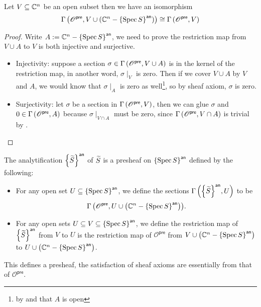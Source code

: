 \begin{corollary}
  Let $V\subseteq\mathbb{C}^{n}$ be an open subset then we have an isomorphism
  \[
{\Gamma\left(\mathscr{O}^{\mathsf{pre}},V \cup (\mathbb{C}^{n} - {\left\{{\operatorname{Spec} S}\right\}}^{\mathsf{an}})\right)} \cong {\Gamma\left(\mathscr{O}^{\mathsf{pre}},V\right)}
  \]
\end{corollary}
\begin{proof}
  Write $A := \mathbb{C}^{n}-{\left\{{\operatorname{Spec} S}\right\}}^{\mathsf{an}}$, we need to prove the restriction map from $V \cup A$ to $V$ is both injective and surjective.
  \begin{itemize}
	\item Injectivity: suppose a section $\sigma \in {\Gamma\left(\mathscr{O}^{\mathsf{pre}},V \cup A\right)}$ is in the kernel of the restriction map, in another word, $\sigma\mid_{V}$ is zero. Then if we cover $V \cup A$ by $V$ and $A$, we would know that $\sigma\mid_{A}$ is zero as well\footnote{by  and that $A$ is open}, so by sheaf axiom, $\sigma$ is zero.
	\item Surjectivity: let $\sigma$ be a section in ${\Gamma\left(\mathscr{O}^{\mathsf{pre}},V\right)}$, then we can glue $\sigma$ and $0 \in {\Gamma\left(\mathscr{O}^{\mathsf{pre}},A\right)}$ because $\sigma\mid_{V \cap A}$ must be zero, since ${\Gamma\left(\mathscr{O}^{\mathsf{pre}},V\cap A\right)}$ is trivial by .
  \end{itemize}
\end{proof}

\begin{definition}\label{def:analytification-sheaf-affine}
  The analytification ${\left\{{\widetilde{S}}\right\}}^{\mathsf{an}}$ of $\widetilde{S}$ is a presheaf on ${\left\{{\operatorname{Spec} S}\right\}}^{\mathsf{an}}$ defined by the following:
  \begin{itemize}
	\item For any open set $U \subseteq {\left\{{\ensuremath{\operatorname{Spec}}S}\right\}}^{\mathsf{an}}$, we define the sections ${\Gamma\left({\left\{{\widetilde{S}}\right\}}^{\mathsf{an}},U\right)}$ to be
		  $${\Gamma\left(\mathscr{O}^{\mathsf{pre}},U \cup \left(\mathbb{C}^{n}-{\left\{{\operatorname{Spec} S}\right\}}^{\mathsf{an}}\right)\right)}.$$
	\item For any open sets $U \subseteq V \subseteq {\left\{{\ensuremath{\operatorname{Spec}}{S}}\right\}}^{\mathsf{an}}$, we define the restriction map of ${\left\{{\widetilde{S}}\right\}}^{\mathsf{an}}$ from $V$ to $U$ is the restriction map of $\mathscr{O}^{\mathsf{pre}}$ from $V \cup \left(\mathbb{C}^{n}-{\left\{{\operatorname{Spec} S}\right\}}^{\mathsf{an}}\right)$ to $U \cup \left(\mathbb{C}^{n}-{\left\{{\operatorname{Spec}{S}}\right\}}^{\mathsf{an}}\right)$.
  \end{itemize}
This defines a presheaf, the satisfaction of sheaf axioms are essentially from that of $\mathscr{O}^{\mathsf{pre}}$.
\end{definition}


